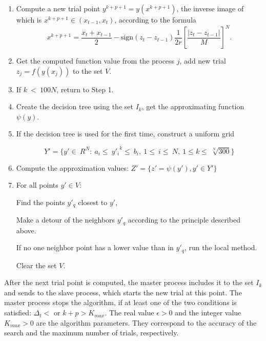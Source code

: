 \documentclass{svproc}
\begin{document}
\begin{enumerate}
	
	\item Compute a new trial point $y^{k+p+1}=y\left(x^{k+p+1}\right)$, the inverse image of which is  $x^{k+p+1}\in\left(x_{t-1},x_t\right)$, according to the formula 
\begin{displaymath}
	x^{k+p+1}=\frac{x_t+x_{t-1}}{2}-\mathrm{sign}\left(z_t-z_{t-1}\right)\frac{1}{2r}\left[\frac{\left|z_t-z_{t-1}\right|}{M}\right]^N.
\end{displaymath}
	
	
	\item Get the computed function value from the process $j$, add new trial $z_j = f(y(x_j))$ to the set  $V$. 
	
	
	\item If $k\ <\ 100 N$, return to Step 1.
	
	
	\item Create the decision tree using the set $I_k$, get the approximating function $\psi(y)$.
	
	\item If the decision tree is used for the first time, construct a uniform grid 
	
	\begin{displaymath} 
		Y'=\{ y'\in\ R^N:\ a_i\le\  {y'_i}^k \le\ b_i,\ 1\le\ i\le\ N,\ 1\le k\le\ \sqrt[N]{300}  \} 
	\end{displaymath} 
	
	
	\item Compute the approximation values: $Z' = \{ z'=  \psi(y'), y' \in Y'\}$
	
	\item For all points $y'\in V$:
	
	Find the points $y'_q$ closest to $y'$,
	
	Make a detour of the neighbors $y'_q$ according to the principle described above.
	
	If no one neighbor point has a lower value than in $y'_q$, run the local method.
	
	Clear the set $V$.
	
\end{enumerate}

After the next trial point is computed, the master process includes it to the set $I_k$ and sends to the  slave process, which starts the new trial at this point. The master process stops the algorithm, if at least one of the two conditions is satisfied: $\Delta_t<$ or  $k+p>K_{max}$. The real value $\epsilon>0$ and the integer value $K_{max}>0$ are the algorithm parameters. They correspond to the accuracy of the search and the maximum number of trials, respectively.
\end{document}
